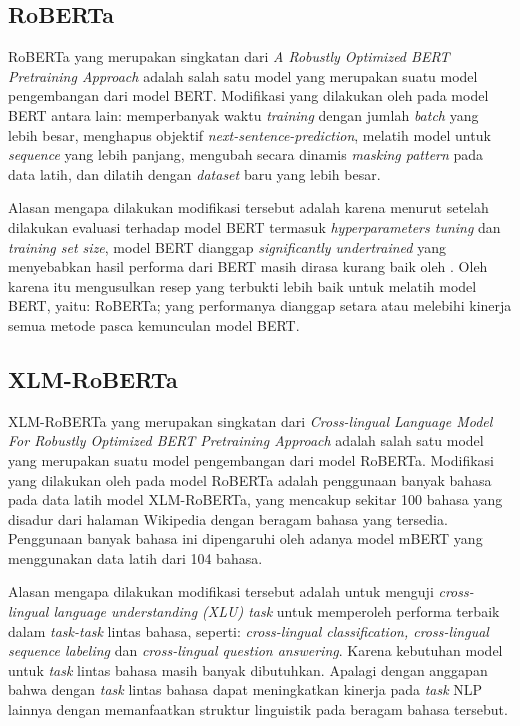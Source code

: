 \subsection{RoBERTa}
RoBERTa yang merupakan singkatan dari \emph{A Robustly Optimized BERT Pretraining Approach} adalah salah satu model yang merupakan suatu model pengembangan dari model BERT. Modifikasi yang dilakukan oleh \citet{liu2019roberta} pada model BERT antara lain: memperbanyak waktu \emph{training} dengan jumlah \emph{batch} yang lebih besar, menghapus objektif \emph{next-sentence-prediction}, melatih model untuk \emph{sequence} yang lebih panjang, mengubah secara dinamis \emph{masking pattern} pada data latih, dan dilatih dengan \emph{dataset} baru yang lebih besar. 

Alasan mengapa dilakukan modifikasi tersebut adalah karena menurut \citet{liu2019roberta} setelah dilakukan evaluasi terhadap model BERT termasuk \emph{hyperparameters tuning} dan \emph{training set size}, model BERT dianggap \emph{ significantly undertrained} yang menyebabkan hasil performa dari BERT masih dirasa kurang baik oleh \citeauthor{liu2019roberta}. Oleh karena itu \citet{liu2019roberta} mengusulkan resep yang terbukti lebih baik untuk melatih model BERT, yaitu: RoBERTa; yang performanya dianggap setara atau melebihi kinerja semua metode pasca kemunculan model BERT.

\subsection{XLM-RoBERTa}
XLM-RoBERTa yang merupakan singkatan dari \emph{Cross-lingual Language Model For Robustly Optimized BERT Pretraining Approach} adalah salah satu model yang merupakan suatu model pengembangan dari model RoBERTa. Modifikasi yang dilakukan oleh \citet{conneau2020unsupervised} pada model RoBERTa adalah penggunaan banyak bahasa pada data latih model XLM-RoBERTa, yang mencakup sekitar 100 bahasa yang disadur dari halaman Wikipedia dengan beragam bahasa yang tersedia. Penggunaan banyak bahasa ini dipengaruhi oleh adanya model mBERT yang menggunakan data latih dari 104 bahasa.

Alasan mengapa dilakukan modifikasi tersebut adalah untuk menguji \emph{cross-lingual language understanding (XLU) task} untuk  memperoleh performa terbaik dalam \emph{task-task} lintas bahasa, seperti: \emph{cross-lingual classification, cross-lingual sequence labeling} dan \emph{cross-lingual question answering}. Karena kebutuhan model untuk \emph{task} lintas bahasa masih banyak dibutuhkan. Apalagi dengan anggapan bahwa dengan \emph{task} lintas bahasa dapat meningkatkan kinerja pada \emph{task} NLP lainnya dengan memanfaatkan struktur linguistik pada beragam bahasa tersebut.

